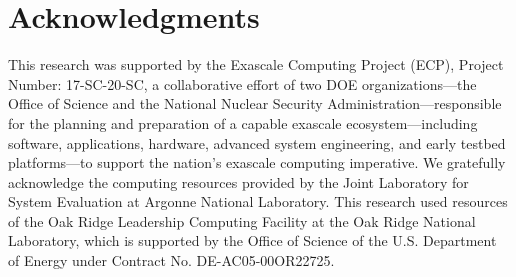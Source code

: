 \documentclass{ecpreportv2}
\begin{document}
\section*{Acknowledgments}

This research was supported by the Exascale Computing Project (ECP), Project
Number: 17-SC-20-SC, a collaborative effort of two DOE organizations---the
Office of Science and the National Nuclear Security Administration---responsible
for the planning and preparation of a capable exascale ecosystem---including
software, applications, hardware, advanced system engineering, and early testbed
platforms---to support the nation's exascale computing imperative. We gratefully
acknowledge the computing resources provided by the Joint Laboratory for System
Evaluation at Argonne National Laboratory. This research used resources of the
Oak Ridge Leadership Computing Facility at the Oak Ridge National Laboratory,
which is supported by the Office of Science of the U.S. Department of Energy
under Contract No. DE-AC05-00OR22725.






\end{document}

